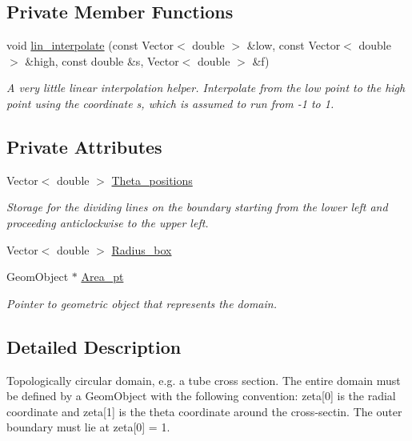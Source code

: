 \subsection*{Private Member Functions}
\begin{DoxyCompactItemize}
\item 
void \hyperlink{classoomph_1_1FullCircleDomain_a77b7b1454eb0082545b1b63310cb978a}{lin\+\_\+interpolate} (const Vector$<$ double $>$ \&low, const Vector$<$ double $>$ \&high, const double \&s, Vector$<$ double $>$ \&f)
\begin{DoxyCompactList}\small\item\em A very little linear interpolation helper. Interpolate from the low point to the high point using the coordinate s, which is assumed to run from -\/1 to 1. \end{DoxyCompactList}\end{DoxyCompactItemize}
\subsection*{Private Attributes}
\begin{DoxyCompactItemize}
\item 
Vector$<$ double $>$ \hyperlink{classoomph_1_1FullCircleDomain_ab995977e0da3045269da04fb15fd2cb6}{Theta\+\_\+positions}
\begin{DoxyCompactList}\small\item\em Storage for the dividing lines on the boundary starting from the lower left and proceeding anticlockwise to the upper left. \end{DoxyCompactList}\item 
Vector$<$ double $>$ \hyperlink{classoomph_1_1FullCircleDomain_a96d5b35a7b41251a033d923afc953636}{Radius\+\_\+box}
\item 
Geom\+Object $\ast$ \hyperlink{classoomph_1_1FullCircleDomain_a49eca6b304caf0840bd99bd18a9a32cd}{Area\+\_\+pt}
\begin{DoxyCompactList}\small\item\em Pointer to geometric object that represents the domain. \end{DoxyCompactList}\end{DoxyCompactItemize}


\subsection{Detailed Description}
Topologically circular domain, e.\+g. a tube cross section. The entire domain must be defined by a Geom\+Object with the following convention\+: zeta\mbox{[}0\mbox{]} is the radial coordinate and zeta\mbox{[}1\mbox{]} is the theta coordinate around the cross-\/sectin. The outer boundary must lie at zeta\mbox{[}0\mbox{]} = 1. 

